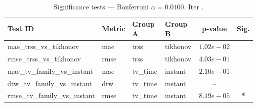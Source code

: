 ﻿%
\begin{table}[ht]
\centering
\caption[EEG reconstruction - Iteration it30]{Significance tests — Bonferroni $\alpha=0.0100$. Iter .}
\label{tab:sig_it30_knn_k5_3syn}
\small
\begin{tabular}{llllcc}
\toprule
Test ID & Metric & Group A & Group B & p-value & Sig. \\
\midrule
mae\_trss\_vs\_tikhonov & mae & trss & tikhonov & $1.02e-02$ &  \\
rmse\_trss\_vs\_tikhonov & rmse & trss & tikhonov & $4.03e-01$ &  \\
mae\_tv\_family\_vs\_instant & mae & tv\_time & instant & $2.10e-01$ &  \\
dtw\_tv\_family\_vs\_instant & dtw & tv\_time & instant & -- &  \\
rmse\_tv\_family\_vs\_instant & rmse & tv\_time & instant & $8.19e-05$ & \textbf{*} \\
\bottomrule
\end{tabular}
\end{table}







